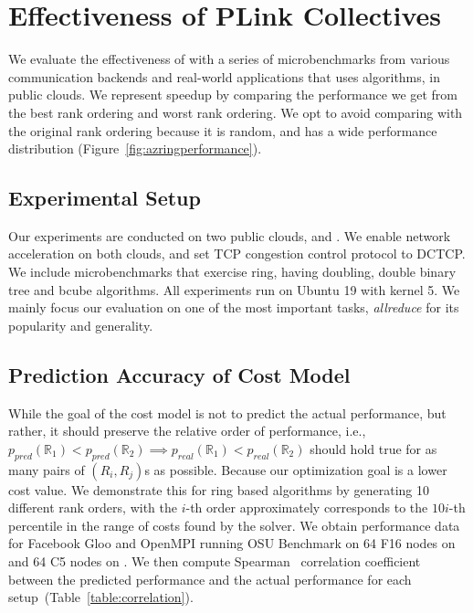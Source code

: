 
\section{Effectiveness of PLink Collectives}
We evaluate the effectiveness of \cmpi with a series of microbenchmarks from various communication backends and real-world applications that uses \collectives algorithms, in public clouds. We represent speedup by comparing the performance we get from the best rank ordering and worst rank ordering. We opt to avoid comparing with the original rank ordering because it is random, and has a wide performance distribution (Figure~\ref{fig:azringperformance}).

\subsection{Experimental Setup}
Our experiments are conducted on two public clouds, \azure and \ectwo. We enable network acceleration on both clouds, and set TCP congestion control protocol to DCTCP. We include microbenchmarks that exercise ring, having doubling, double binary tree and bcube algorithms.  All experiments run on Ubuntu 19 with kernel 5. We mainly focus our evaluation on one of the most important \collectives tasks, \textit{allreduce} for its popularity and generality. %

\subsection{Prediction Accuracy of Cost Model}
While the goal of the cost model is not to predict the actual performance, but rather, it should preserve the relative order of performance, i.e., $p_{pred}(\mathbb{R}_1) < p_{pred}(\mathbb{R}_2) \implies p_{real}(\mathbb{R}_1) < p_{real}(\mathbb{R}_2)$ should hold true for as many pairs of $(R_i, R_j)$s as possible. Because our optimization goal is a lower cost value. We demonstrate this for ring based \mpi algorithms by generating 10 different rank orders, with the $i$-th order approximately corresponds to the $10i$-th percentile in the range of costs found by the solver. We obtain performance data for Facebook Gloo and OpenMPI running OSU Benchmark on 64 F16 nodes on \azure and 64 C5 nodes on \ectwo. We then compute Spearman~\cite{spearman} correlation coefficient between the predicted performance and the actual performance for each setup~(Table~\ref{table:correlation}). 


